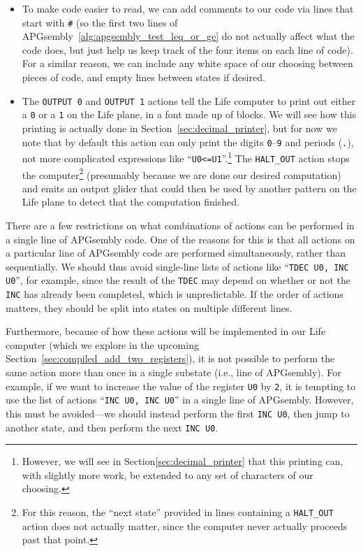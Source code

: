 \begin{itemize}
	\item To make code easier to read, we can add comments to our code via lines that start with \texttt{\#} (so the first two lines of APGsembly~\ref{alg:apgsembly_test_leq_or_ge} do not actually affect what the code does, but just help us keep track of the four items on each line of code). For a similar reason, we can include any white space of our choosing between pieces of code, and empty lines between states if desired.\smallskip
	
	\item The \texttt{OUTPUT 0} and \texttt{OUTPUT 1} actions tell the Life computer to print out either a \texttt{0} or a \texttt{1} on the Life plane, in a font made up of blocks. We will see how this printing is actually done in Section~\ref{sec:decimal_printer}, but for now we note that by default this action can only print the digits \texttt{0}--\texttt{9} and periods (\texttt{.}), not more complicated expressions like ``\texttt{U0<=U1}''.\footnote{However, we will see in Section\ref{sec:decimal_printer} that this printing can, with slightly more work, be extended to any set of characters of our choosing.} The \texttt{HALT\_OUT} action stops the computer\footnote{For this reason, the ``next state'' provided in lines containing a \texttt{HALT\_OUT} action does not actually matter, since the computer never actually proceeds past that point.} (presumably because we are done our desired computation) and emits an output glider that could then be used by another pattern on the Life plane to detect that the computation finished.\smallskip
\end{itemize}

There are a few restrictions on what combinations of actions can be performed in a single line of APGsembly code. One of the reasons for this is that all actions on a particular line of APGsembly code are performed simultaneously, rather than sequentially. We should thus avoid single-line lists of actions like ``\texttt{TDEC U0, INC U0}'', for example, since the result of the \texttt{TDEC} may depend on whether or not the \texttt{INC} has already been completed, which is unpredictable. If the order of actions matters, they should be split into states on multiple different lines.

Furthermore, because of how these actions will be implemented in our Life computer (which we explore in the upcoming Section~\ref{sec:compiled_add_two_registers}), it is not possible to perform the same action more than once in a single substate (i.e., line of APGsembly). For example, if we want to increase the value of the register \texttt{U0} by \texttt{2}, it is tempting to use the list of actions ``\texttt{INC U0, INC U0}'' in a single line of APGsembly. However, this must be avoided---we should instead perform the first \texttt{INC U0}, then jump to another state, and then perform the next \texttt{INC U0}.

